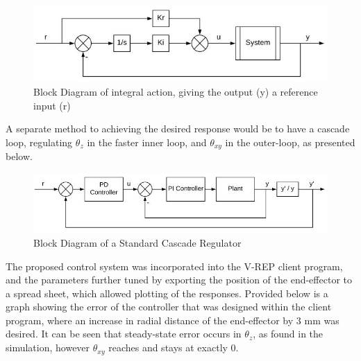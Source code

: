 \documentclass[12pt,openany,a4paper]{book}
\begin{document}
\begin{center}
\begin{figure}[htb]
  \includegraphics[width=1\linewidth]{control_system_integral_action.jpg}
\caption{Block Diagram of integral action, giving the output (y) a reference input (r)}
\end{figure}
\end{center}


A separate method to achieving the desired response would be to have a cascade loop, regulating $\theta_z$ in the faster inner loop, and $\theta_{xy}$ in the outer-loop, as presented below.

\begin{center}
\begin{figure}[htb]
  \includegraphics[width=1\linewidth]{control_system_cascade.jpg}
\caption{Block Diagram of a Standard Cascade Regulator}
\end{figure}
\end{center}

The proposed control system was incorporated into the V-REP client program, and the parameters further tuned by exporting the position of the end-effector to a spread sheet, which allowed plotting of the responses. Provided below is a graph showing the error of the controller that was designed within the client program, where an increase in radial distance of the end-effector by 3 mm was desired. It can be seen that steady-state error occurs in $\theta_z$, as found in the simulation, however $\theta_{xy}$ reaches and stays at exactly 0.
\end{document}
